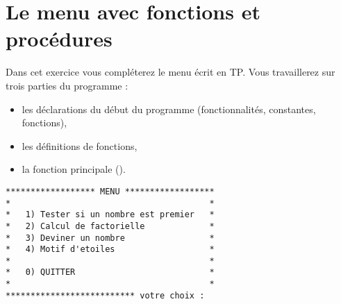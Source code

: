 
\section{Le menu avec fonctions et procédures}

\begin{minipage}[t]{.5 \linewidth}
  Dans cet exercice vous compléterez le menu écrit en TP. Vous
  travaillerez sur trois parties du programme :
  \begin{itemize}
  \item les déclarations du début du programme (fonctionnalités,
    constantes, fonctions),
  \item les définitions de fonctions,
  \item la fonction principale ().
  \end{itemize}
\end{minipage}
\hfill
\begin{minipage}[t]{.4\linewidth}
{\footnotesize
\begin{verbatim}
****************** MENU ******************
*                                        *
*   1) Tester si un nombre est premier   *
*   2) Calcul de factorielle             *
*   3) Deviner un nombre                 *
*   4) Motif d'etoiles                   *
*                                        *
*   0) QUITTER                           *
*                                        *
************************** votre choix :
\end{verbatim}
}
\end{minipage}

